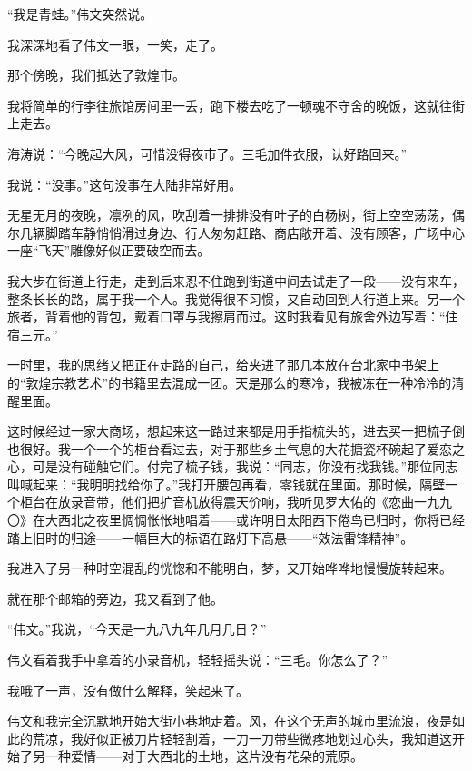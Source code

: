 \par “我是青蛙。”伟文突然说。
\par 我深深地看了伟文一眼，一笑，走了。
\par 那个傍晚，我们抵达了敦煌市。
\par 我将简单的行李往旅馆房间里一丢，跑下楼去吃了一顿魂不守舍的晚饭，这就往街上走去。
\par 海涛说：“今晚起大风，可惜没得夜市了。三毛加件衣服，认好路回来。”
\par 我说：“没事。”这句没事在大陆非常好用。
\par 无星无月的夜晚，凛冽的风，吹刮着一排排没有叶子的白杨树，街上空空荡荡，偶尔几辆脚踏车静悄悄滑过身边、行人匆匆赶路、商店敞开着、没有顾客，广场中心一座“飞天”雕像好似正要破空而去。
\par 我大步在街道上行走，走到后来忍不住跑到街道中间去试走了一段——没有来车，整条长长的路，属于我一个人。我觉得很不习惯，又自动回到人行道上来。另一个旅者，背着他的背包，戴着口罩与我擦肩而过。这时我看见有旅舍外边写着：“住宿三元。”
\par 一时里，我的思绪又把正在走路的自己，给夹进了那几本放在台北家中书架上的“敦煌宗教艺术”的书籍里去混成一团。天是那么的寒冷，我被冻在一种冷冷的清醒里面。
\par 这时候经过一家大商场，想起来这一路过来都是用手指梳头的，进去买一把梳子倒也很好。我一个一个的柜台看过去，对于那些乡土气息的大花搪瓷杯碗起了爱恋之心，可是没有碰触它们。付完了梳子钱，我说：“同志，你没有找我钱。”那位同志叫喊起来：“我明明找给你了。”我打开腰包再看，零钱就在里面。那时候，隔壁一个柜台在放录音带，他们把扩音机放得震天价响，我听见罗大佑的《恋曲一九九〇》在大西北之夜里惆惆怅怅地唱着——或许明日太阳西下倦鸟已归时，你将已经踏上旧时的归途——一幅巨大的标语在路灯下高悬——“效法雷锋精神”。
\par 我进入了另一种时空混乱的恍惚和不能明白，梦，又开始哗哗地慢慢旋转起来。
\par 就在那个邮箱的旁边，我又看到了他。
\par “伟文。”我说，“今天是一九八九年几月几日？”
\par 伟文看着我手中拿着的小录音机，轻轻摇头说：“三毛。你怎么了？”
\par 我哦了一声，没有做什么解释，笑起来了。
\par 伟文和我完全沉默地开始大街小巷地走着。风，在这个无声的城市里流浪，夜是如此的荒凉，我好似正被刀片轻轻割着，一刀一刀带些微疼地划过心头，我知道这开始了另一种爱情——对于大西北的土地，这片没有花朵的荒原。
